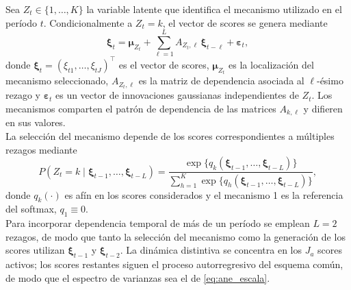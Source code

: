Sea $Z_t\in\{1,\ldots,K\}$ la variable latente que identifica el mecanismo utilizado en el período $t$. Condicionalmente a $Z_t=k$, el vector de scores se genera mediante
\begin{equation}
\label{eq:ane_algC3}
\boldsymbol{\xi}_t
=
\boldsymbol{\mu}_{Z_t}
+
\sum_{\ell=1}^{L}
A_{Z_t,\ell}\,
\boldsymbol{\xi}_{t-\ell}
+
\boldsymbol{\varepsilon}_t,
\end{equation}
donde $\boldsymbol{\xi}_t=(\xi_{t1},\ldots,\xi_{tJ})^\top$ es el vector de scores, $\boldsymbol{\mu}_{Z_t}$ es la localización del mecanismo seleccionado, $A_{Z_t,\ell}$ es la matriz de dependencia asociada al $\ell$-ésimo rezago y $\boldsymbol{\varepsilon}_t$ es un vector de innovaciones gaussianas independientes de $Z_t$. Los mecanismos comparten el patrón de dependencia de las matrices $A_{k,\ell}$ y difieren en sus valores.\\

La selección del mecanismo depende de los scores correspondientes a múltiples rezagos mediante
\begin{equation}
\label{eq:ane_algC3_asignacion}
P
\left(
Z_t=k
\mid
\boldsymbol{\xi}_{t-1},
\ldots,
\boldsymbol{\xi}_{t-L}
\right)
=
\frac{
\exp\bigl\{
q_k
\left(
\boldsymbol{\xi}_{t-1},
\ldots,
\boldsymbol{\xi}_{t-L}
\right)
\bigr\}
}{
\displaystyle
\sum_{h=1}^{K}
\exp\bigl\{
q_h
\left(
\boldsymbol{\xi}_{t-1},
\ldots,
\boldsymbol{\xi}_{t-L}
\right)
\bigr\}
},
\end{equation}
donde $q_k(\cdot)$ es afín en los scores considerados y el mecanismo 1 es la referencia del softmax, $q_1\equiv 0$.\\

Para incorporar dependencia temporal de más de un período se emplean $L=2$ rezagos, de modo que tanto la selección del mecanismo como la generación de los scores utilizan $\boldsymbol{\xi}_{t-1}$ y $\boldsymbol{\xi}_{t-2}$. La dinámica distintiva se concentra en los $J_a$ scores activos; los scores restantes siguen el proceso autorregresivo del esquema común, de modo que el espectro de varianzas sea el de \eqref{eq:ane_escala}.\\

